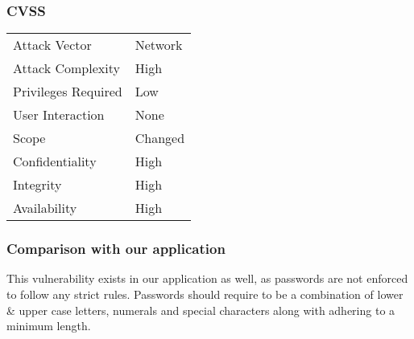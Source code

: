 \subsubsection{CVSS}
\begin{tabular}{l | l}
Attack Vector		& Network \\
Attack Complexity	& High \\
Privileges Required & Low \\
User Interaction	& None \\
Scope				& Changed \\
Confidentiality		& High \\
Integrity			& High \\
Availability		& High
\end{tabular}

\subsubsection{Comparison with our application}
This vulnerability exists in our application as well, as passwords are not enforced to follow any strict rules. Passwords should require to be a combination of lower \& upper case letters, numerals and special characters along with adhering to a minimum length.
\clearpage